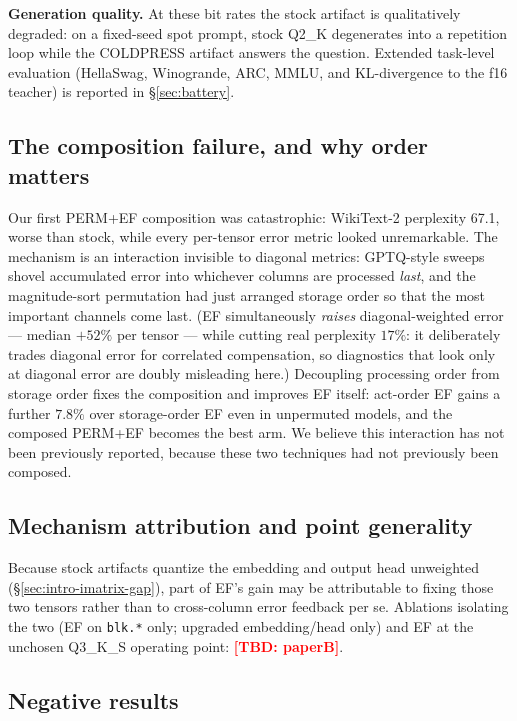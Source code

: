 \documentclass[11pt]{article}
\newcommand{\TBD}[1]{\textcolor{red}{\textbf{[TBD: #1]}}}
\begin{document}
\textbf{Generation quality.} At these bit rates the stock artifact is qualitatively
degraded: on a fixed-seed spot prompt, stock Q2\_K degenerates into a repetition loop
while the COLDPRESS artifact answers the question. Extended task-level evaluation
(HellaSwag, Winogrande, ARC, MMLU, and KL-divergence to the f16 teacher) is reported
in \S\ref{sec:battery}.

\subsection{The composition failure, and why order matters}
\label{sec:actorder}

Our first PERM+EF composition was catastrophic: WikiText-2 perplexity 67.1, worse
than stock, while every per-tensor error metric looked unremarkable. The mechanism is
an interaction invisible to diagonal metrics: GPTQ-style sweeps shovel accumulated
error into whichever columns are processed \emph{last}, and the magnitude-sort
permutation had just arranged storage order so that the most important channels come
last. (EF simultaneously \emph{raises} diagonal-weighted error --- median $+52\%$
per tensor --- while cutting real perplexity $17\%$: it deliberately trades diagonal
error for correlated compensation, so diagnostics that look only at diagonal error
are doubly misleading here.) Decoupling processing order from storage order fixes the
composition and improves EF itself: act-order EF gains a further $7.8\%$ over
storage-order EF even in unpermuted models, and the composed PERM+EF becomes the best
arm. We believe this interaction has not been previously reported, because these two
techniques had not previously been composed.

\subsection{Mechanism attribution and point generality}
\label{sec:attribution}

Because stock artifacts quantize the embedding and output head unweighted
(\S\ref{sec:intro-imatrix-gap}), part of EF's gain may be attributable to fixing
those two tensors rather than to cross-column error feedback per se. Ablations
isolating the two (EF on \texttt{blk.*} only; upgraded embedding/head only) and EF at
the unchosen Q3\_K\_S operating point: \TBD{paperB}.

\subsection{Negative results}
\label{sec:negative}
\end{document}
